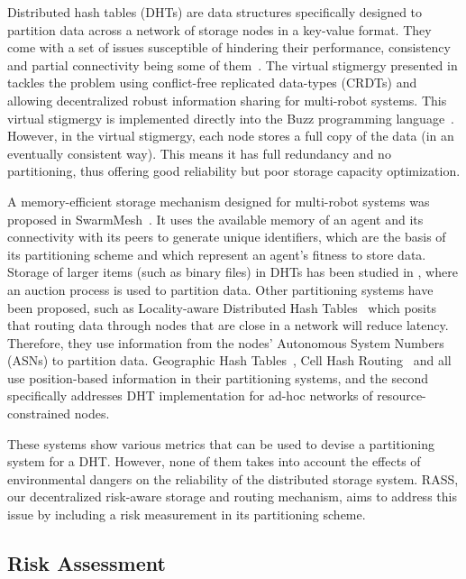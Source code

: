 \documentclass[sigconf]{aamas}
\begin{document}
Distributed hash tables (DHTs) are data structures specifically
designed to partition data across a network of storage nodes in a
key-value format. They come with a set of issues susceptible of
hindering their performance, consistency and partial connectivity
being some of them~\cite{amigoni2017multirobot}. The virtual stigmergy
presented in \cite{pinciroliTuple2016} tackles the problem using
conflict-free replicated data-types (CRDTs) and allowing decentralized
robust information sharing for multi-robot systems. This virtual
stigmergy is implemented directly into the Buzz programming
language~\cite{pinciroliBuzz2016}. However, in the virtual stigmergy,
each node stores a full copy of the data (in an eventually consistent
way). This means it has full redundancy and no partitioning, thus
offering good reliability but poor storage capacity optimization.

A memory-efficient storage mechanism designed for multi-robot systems
was proposed in SwarmMesh~\cite{majcherczykSwarmmesh2020}. It
uses the available memory of an agent and its connectivity with its
peers to generate unique identifiers, which are the basis of its
partitioning scheme and which represent an agent's fitness to store
data. Storage of larger items (such as binary files) in DHTs has been
studied in \cite{varadharajan2020soul}, where an auction process is
used to partition data.  Other partitioning systems have been
proposed, such as Locality-aware Distributed Hash
Tables~\cite{wu2008ldht} which posits that routing data through nodes
that are close in a network will reduce latency. Therefore, they use
information from the nodes' Autonomous System Numbers (ASNs) to
partition data.  Geographic Hash Tables~\cite{ratnasamy2002ght}, Cell
Hash Routing~\cite{araujo2005chr} and \cite{ahullo2008supporting} all
use position-based information in their partitioning systems, and the
second specifically addresses DHT implementation for ad-hoc networks
of resource-constrained nodes.

These systems show various metrics that can be used to devise a
partitioning system for a DHT. However, none of them takes into
account the effects of environmental dangers on the reliability of the
distributed storage system. RASS, our decentralized risk-aware storage and routing mechanism, aims to address this issue by including
a risk measurement in its partitioning scheme.

\subsection{Risk Assessment}
\end{document}

